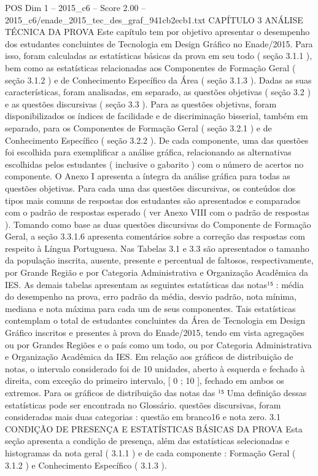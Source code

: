 \begin{textsample}{POS Dim 1 – 2015\_c6 – Score 2.00 – 2015\_c6/enade\_2015\_tec\_des\_graf\_941cb2ecb1.txt}  \label{ex:f1_pos_154}
CAPÍTULO 3 ANÁLISE TÉCNICA DA PROVA Este capítulo tem por objetivo apresentar o desempenho dos estudantes concluintes de Tecnologia em Design Gráfico no Enade/2015.
Para isso, foram calculadas as estatísticas básicas da prova em seu todo ( seção 3.1.1 ), bem como as estatísticas relacionadas aos Componentes de Formação Geral ( seção 3.1.2 ) e de Conhecimento Específico da Área ( seção 3.1.3 ).
Dadas as suas características, foram analisadas, em separado, as questões objetivas ( seção 3.2 ) e as questões discursivas ( seção 3.3 ).
Para as questões objetivas, foram disponibilizados os índices de facilidade e de discriminação bisserial, também em separado, para os Componentes de Formação Geral ( seção 3.2.1 ) e de Conhecimento Específico ( seção 3.2.2 ).
De cada componente, uma das questões foi escolhida para exemplificar a análise gráfica, relacionando as alternativas escolhidas pelos estudantes ( inclusive o gabarito ) com o número de acertos no componente.
O Anexo I apresenta a íntegra da análise gráfica para todas as questões objetivas.
Para cada uma das questões discursivas, os conteúdos dos tipos mais comuns de respostas dos estudantes são apresentados e comparados com o padrão de respostas esperado ( ver Anexo VIII com o padrão de respostas ).
Tomando como base as duas questões discursivas do Componente de Formação Geral, a seção 3.3.1.6 apresenta comentários sobre a correção das respostas com respeito à Língua Portuguesa.
Nas Tabelas 3.1 e 3.3 são apresentados o tamanho da população inscrita, ausente, presente e percentual de faltosos, respectivamente, por Grande Região e por Categoria Administrativa e Organização Acadêmica da IES.
As demais tabelas apresentam as seguintes estatísticas das notas¹⁵ : média do desempenho na prova, erro padrão da média, desvio padrão, nota mínima, mediana e nota máxima para cada um de seus componentes.
Tais estatísticas contemplam o total de estudantes concluintes da Área de Tecnologia em Design Gráfico inscritos e presentes à prova do Enade/2015, tendo em vista agregações ou por Grandes Regiões e o país como um todo, ou por Categoria Administrativa e Organização Acadêmica da IES.
Em relação aos gráficos de distribuição de notas, o intervalo considerado foi de 10 unidades, aberto à esquerda e fechado à direita, com exceção do primeiro intervalo, [ 0 ; 10 ], fechado em ambos os extremos.
Para os gráficos de distribuição das notas das ¹⁵ Uma definição dessas estatísticas pode ser encontrada no Glossário. questões discursivas, foram consideradas mais duas categorias : questão em branco16 e nota zero. 3.1 CONDIÇÃO DE PRESENÇA E ESTATÍSTICAS BÁSICAS DA PROVA Esta seção apresenta a condição de presença, além das estatísticas selecionadas e histogramas da nota geral ( 3.1.1 ) e de cada componente : Formação Geral ( 3.1.2 ) e Conhecimento Específico ( 3.1.3 ).

\end{textsample}
